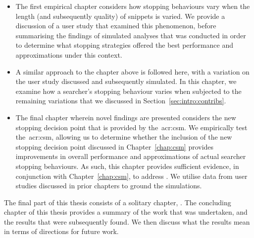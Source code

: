 \begin{itemize}
    \item[]{ The first empirical chapter considers how stopping behaviours vary when the length (and subsequently quality) of snippets is varied. We provide a discussion of a user study that examined this phenomenon, before summarising the findings of simulated analyses that was conducted in order to determine what stopping strategies offered the best performance and approximations under this context.}
    
    \item[]{ A similar approach to the chapter above is followed here, with a variation on the user study discussed and subsequently simulated. In this chapter, we examine how a searcher's stopping behaviour varies when subjected to the remaining variations that we discussed in Section~\ref{sec:intro:contribs}.}
    
    \item[]{ The final chapter wherein novel findings are presented considers the new stopping decision point that is provided by the~\gls{acr:csm}. We empirically test the~\gls{acr:csm}, allowing us to determine whether the inclusion of the new stopping decision point discussed in Chapter~\ref{chap:csm} provides improvements in overall performance and approximations of actual searcher stopping behaviours. As such, this chapter provides sufficient evidence, in conjunction with Chapter~\ref{chap:csm}, to address . We utilise data from user studies discussed in prior chapters to ground the simulations.}
\end{itemize}

\noindent
{} The final part of this thesis consists of a solitary chapter, . The concluding chapter of this thesis provides a summary of the work that was undertaken, and the results that were subsequently found. We then discuss what the results mean in terms of directions for future work.